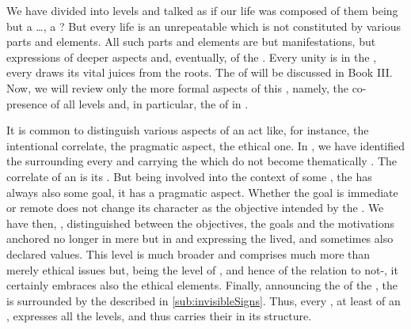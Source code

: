 %
We have divided  into levels and talked as if our life was
composed of them being but a \ldots {}, a ? But every
life is an unrepeatable  which is not constituted by various parts and
elements. All such parts and elements are but manifestations, but 
expressions of deeper aspects and, eventually, of the . Every
 unity is  in the , every
 draws its vital juices from the  roots. The
 of  will be discussed in Book III. Now, we
will review only the more formal aspects of this , namely, the 
co-presence of all levels and, in particular,  the  of
 in . 

\label{sub:mit}%


\pa\label{rest} %
It is common to distinguish various aspects of an act like, for instance, the
intentional correlate, the pragmatic aspect, the ethical one.  In
, we have identified the  surrounding every 
and carrying the  which do not become thematically
. The  correlate of an  is its .
But being involved into the context of some , the  has always
also some goal, it has a pragmatic aspect. Whether the goal is immediate or
remote does not change its character as the  objective intended by 
 the . We have then, , distinguished between
the objectives, the  goals and the motivations anchored no longer
in mere  but in  and expressing the lived, and
sometimes also declared values. This level is much broader and comprises much
more than merely ethical issues but, being the level of , and hence
of the relation to not-, it certainly embraces also the ethical
elements. Finally, announcing the  of the , the
 is surrounded by the  described in \ref{sub:invisibleSigns}.
Thus, every , at least  of an , expresses
all the levels, and thus carries their  in its structure.

